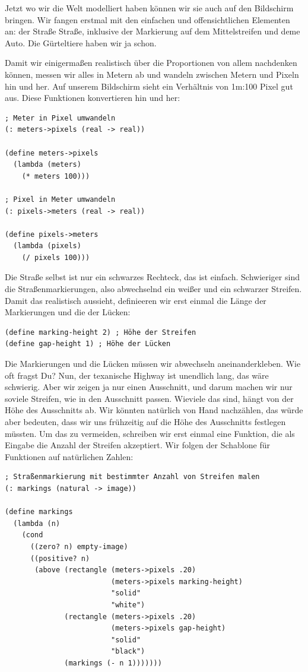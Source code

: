 Jetzt wo wir die Welt modelliert haben können wir sie auch auf den
Bildschirm bringen.  Wir fangen erstmal mit den einfachen und
offensichtlichen Elementen an: der Straße Straße, inklusive der
Markierung auf dem Mittelstreifen und deme Auto.  Die Gürteltiere
haben wir ja schon.

Damit wir einigermaßen realistisch über die Proportionen von allem
nachdenken können, messen wir alles in Metern ab und wandeln zwischen
Metern und Pixeln hin und her.  Auf unserem Bildschirm sieht ein
Verhältnis von 1m:100 Pixel gut aus.  Diese Funktionen konvertieren
hin und her:

\begin{lstlisting}
; Meter in Pixel umwandeln
(: meters->pixels (real -> real))

(define meters->pixels
  (lambda (meters)
    (* meters 100)))

; Pixel in Meter umwandeln
(: pixels->meters (real -> real))

(define pixels->meters
  (lambda (pixels)
    (/ pixels 100)))
\end{lstlisting}
%
Die Straße selbst ist nur ein schwarzes Rechteck, das ist einfach.
Schwieriger sind die Straßenmarkierungen, also abwechselnd ein weißer
und ein schwarzer Streifen.  Damit das realistisch aussieht,
definieeren wir erst einmal die Länge der Markierungen und die der Lücken:
%
\begin{lstlisting}
(define marking-height 2) ; Höhe der Streifen
(define gap-height 1) ; Höhe der Lücken
\end{lstlisting}
%
Die Markierungen und die Lücken müssen wir abwechseln
aneinanderkleben.  Wie oft fragst Du?  Nun, der texanische Highway ist
unendlich lang, das wäre schwierig.  Aber wir zeigen ja nur einen
Ausschnitt, und darum machen wir nur soviele Streifen, wie in den
Ausschnitt passen.  Wieviele das sind, hängt von der Höhe des
Ausschnitts ab.  Wir könnten natürlich von Hand nachzählen, das würde
aber bedeuten, dass wir uns frühzeitig auf die Höhe des Ausschnitts
festlegen müssten.  Um das zu vermeiden, schreiben wir erst einmal
eine Funktion, die als Eingabe die Anzahl der Streifen akzeptiert.
Wir folgen der Schablone für Funktionen auf natürlichen Zahlen:
%
\begin{lstlisting}
; Straßenmarkierung mit bestimmter Anzahl von Streifen malen
(: markings (natural -> image))

(define markings
  (lambda (n)
    (cond
      ((zero? n) empty-image)
      ((positive? n)
       (above (rectangle (meters->pixels .20)
                         (meters->pixels marking-height)
                         "solid"
                         "white")
              (rectangle (meters->pixels .20)
                         (meters->pixels gap-height)
                         "solid"
                         "black")
              (markings (- n 1)))))))
\end{lstlisting}
